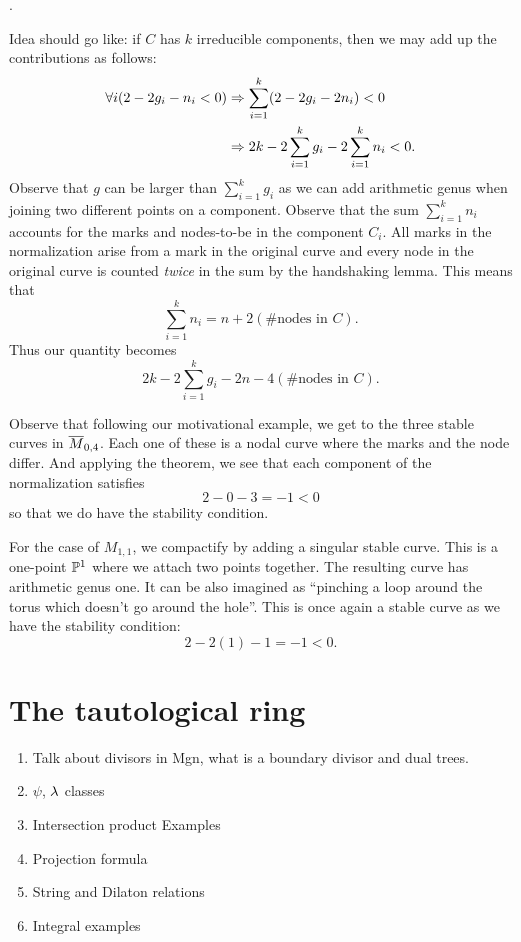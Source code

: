 \documentclass[12pt]{memoir}
\begin{document}
\begin{center}
    .
\end{center}

\begin{ptcb}
    Idea should go like: if $C$ has $k$ irreducible components, then we may add up the contributions as follows:
    \begin{align*}
    \forall i(2-2g_i-n_i<0)&\Rightarrow\sum_{i=1}^k(2-2g_i-2n_i)<0\\
    &\Rightarrow2k-2\sum_{i=1}^k g_i-2\sum_{i=1}^k n_i<0.
    \end{align*}
    Observe that $g$ can be larger than $\sum_{i=1}^k g_i$ as we can add arithmetic genus when joining two different points on a component. Observe that the sum $\sum_{i=1}^k n_i$ accounts for the marks and nodes-to-be in the component $C_i$. All marks in the normalization arise from a mark in the original curve and every node in the original curve is counted \emph{twice} in the sum by the handshaking lemma. This means that 
    $$\sum_{i=1}^k n_i=n+2(\#\text{nodes in }C).$$
    Thus our quantity becomes 
    $$2k-2\sum_{i=1}^kg_i-2n-4(\#\text{nodes in }C).$$
\end{ptcb}
\begin{Ex}
    Observe that following our motivational example, we get to the three stable curves in $\overline M_{0,4}$. Each one of these is a nodal curve where the marks and the node differ. And applying the theorem, we see that each component of the normalization satisfies
    $$2-0-3=-1<0$$
    so that we do have the stability condition. 
\end{Ex}

\begin{Ex}
    For the case of $M_{1,1}$, we compactify by adding a singular stable curve. This is a one-point $\mathbb{P}^1$ where we attach two points together. The resulting curve has arithmetic genus one. It can be also imagined as ``pinching a loop around the torus which doesn't go around the hole''. This is once again a stable curve as we have the stability condition:
    $$2-2(1)-1=-1<0.$$
\end{Ex}

\section{The tautological ring}

\begin{enumerate}
    \item Talk about divisors in Mgn, what is a boundary divisor and dual trees.
    \item $\psi$, $\lambda$ classes
    \item Intersection product Examples
    \item Projection formula
    \item String and Dilaton relations
    \item Integral examples
\end{enumerate}
\end{document}
